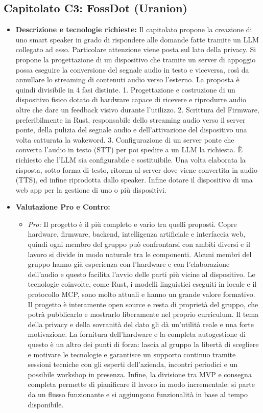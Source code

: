 \documentclass[12pt,a4paper]{article}
\newcommand{\tightlist}{\setlength{\itemsep}{1pt}\setlength{\parskip}{0pt}}
\begin{document}
\hypertarget{capitolato-c3}{%
\subsection{Capitolato C3: FossDot (Uranion)}}
\begin{itemize}
\tightlist
\item \textbf{Descrizione e tecnologie richieste:} Il capitolato propone la creazione di uno smart speaker in grado di rispondere alle domande fatte tramite un LLM collegato ad esso.
Particolare attenzione viene posta sul lato della privacy. Si propone la progettazione di un dispositivo che tramite un server di appoggio possa eseguire la conversione del segnale audio in testo e viceversa, così da annullare lo streaming di contenuti audio verso l’esterno. 
La proposta è quindi divisibile in 4 fasi distinte. 1. Progettazione e costruzione di un dispositivo fisico dotato di hardware capace di ricevere e riprodurre audio oltre che dare un feedback visivo durante l’utilizzo. 2. Scrittura del Firmware, preferibilmente in Rust, responsabile dello streaming audio verso il server ponte, della pulizia del segnale audio e dell’attivazione del dispositivo una volta catturata la wakeword. 3. Configurazione di un server ponte che converta l’audio in testo (STT) per poi spedire a un LLM la richiesta. È richiesto che l'LLM sia configurabile e sostituibile. Una volta elaborata la risposta, sotto forma di testo, ritorna al server dove viene convertita in audio (TTS), ed infine riprodotta dallo speaker.  
Infine dotare il dispositivo di una web app per la gestione di uno o più dispositivi.

\item \textbf{Valutazione Pro e Contro:}
  \begin{itemize}
  \tightlist
  \item \emph{Pro:} Il progetto è il più completo e vario tra quelli proposti. Copre hardware, firmware, backend, intelligenza artificiale e interfaccia web, quindi ogni membro del gruppo può confrontarsi con ambiti diversi e il lavoro si divide in modo naturale tra le componenti. Alcuni membri del gruppo hanno già esperienza con l’hardware e con l’elaborazione dell’audio e questo facilita l’avvio delle parti più vicine al dispositivo. Le tecnologie coinvolte, come Rust, i modelli linguistici eseguiti in locale e il protocollo MCP, sono molto attuali e hanno un grande valore formativo. Il progetto è interamente open source e resta di proprietà del gruppo, che potrà pubblicarlo e mostrarlo liberamente nel proprio curriculum.
Il tema della privacy e della sovranità del dato gli dà un’utilità reale e una forte motivazione.
La fornitura dell’hardware e la completa autogestione di questo è un altro dei punti di forza:
lascia al gruppo la libertà di scegliere e motivare le tecnologie e garantisce un supporto continuo tramite sessioni tecniche con gli esperti dell’azienda, incontri periodici e un possibile workshop in presenza. Infine, la divisione tra MVP e consegna completa permette di pianificare il lavoro in modo incrementale: si parte da un flusso funzionante e si aggiungono funzionalità in base al tempo disponibile.


\end{itemize}
\end{itemize}
\end{document}
